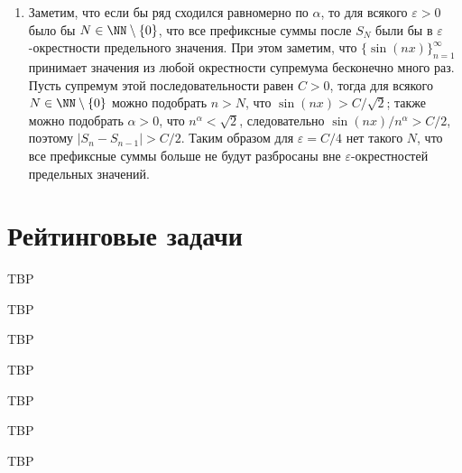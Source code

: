 \documentclass[12pt,a4paper]{article}
\begin{document}
\begin{enumproblem}
\begin{enumerate}
            \item Заметим, что если бы ряд сходился равномерно по $\alpha$, то для всякого $\varepsilon > 0$ было бы $N \in \NN \setminus \{0\}$, что все префиксные суммы после $S_N$ были бы в $\varepsilon$-окрестности предельного значения. При этом заметим, что $\{\sin(nx)\}_{n=1}^\infty$ принимает значения из любой окрестности супремума бесконечно много раз. Пусть супремум этой последовательности равен $C > 0$, тогда для всякого $N \in \NN \setminus \{0\}$ можно подобрать $n > N$, что $\sin(nx) > C/\sqrt{2}$; также можно подобрать $\alpha > 0$, что $n^\alpha < \sqrt{2}$, следовательно $\sin(nx)/n^\alpha > C/2$, поэтому $|S_n - S_{n-1}| > C/2$. Таким образом для $\varepsilon = C/4$ нет такого $N$, что все префиксные суммы больше не будут разбросаны вне $\varepsilon$-окрестностей предельных значений. 
        \end{enumerate}
    \end{enumproblem}

    \section*{Рейтинговые задачи}

    \begin{enumproblem}
        TBP
    \end{enumproblem}

    \begin{enumproblem}
        TBP
    \end{enumproblem}

    \begin{enumproblem}
        TBP
    \end{enumproblem}

    \begin{enumproblem}
        TBP
    \end{enumproblem}

    \begin{enumproblem}
        TBP
    \end{enumproblem}

    \begin{enumproblem}
        TBP
    \end{enumproblem}

    \begin{enumproblem}
        TBP
    \end{enumproblem}
    
\end{document}
